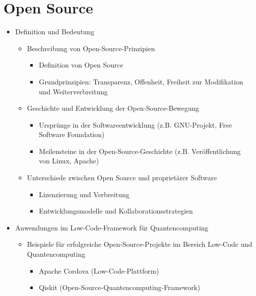 \section{Open Source}
\begin{itemize}
    \item Definition und Bedeutung
        \begin{itemize}
            \item Beschreibung von Open-Source-Prinzipien
                \begin{itemize}
                    \item Definition von Open Source
                    \item Grundprinzipien: Transparenz, Offenheit, Freiheit zur Modifikation und Weiterverbreitung
                \end{itemize}
            \item Geschichte und Entwicklung der Open-Source-Bewegung
                \begin{itemize}
                    \item Ursprünge in der Softwareentwicklung (z.B. GNU-Projekt, Free Software Foundation)
                    \item Meilensteine in der Open-Source-Geschichte (z.B. Veröffentlichung von Linux, Apache)
                \end{itemize}
            \item Unterschiede zwischen Open Source und proprietärer Software
                \begin{itemize}
                    \item Lizenzierung und Verbreitung
                    \item Entwicklungsmodelle und Kollaborationsstrategien
                \end{itemize}
        \end{itemize}
    \item Anwendungen im Low-Code-Framework für Quantencomputing
        \begin{itemize}
            \item Beispiele für erfolgreiche Open-Source-Projekte im Bereich Low-Code und Quantencomputing
                \begin{itemize}
                    \item Apache Cordova (Low-Code-Plattform)
                    \item Qiskit (Open-Source-Quantencomputing-Framework)
                \end{itemize}

\end{itemize}
\end{itemize}
